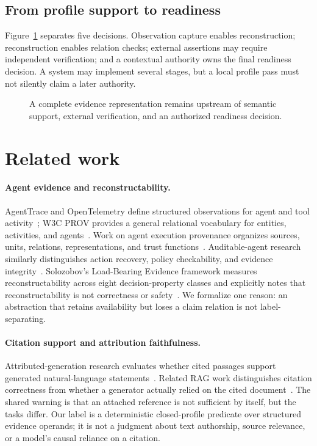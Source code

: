 \documentclass[preprint,12pt]{elsarticle}
\begin{document}
\subsection{From profile support to readiness}

Figure~\ref{fig:layers} separates five decisions. Observation capture enables reconstruction; reconstruction enables relation checks; external assertions may require independent verification; and a contextual authority owns the final readiness decision. A system may implement several stages, but a local profile pass must not silently claim a later authority.

\begin{figure}[t]
  \centering
  \resizebox{\textwidth}{!}{}
  \caption{A complete evidence representation remains upstream of semantic support, external verification, and an authorized readiness decision.}
  \label{fig:layers}
\end{figure}

\section{Related work}

\paragraph{Agent evidence and reconstructability.}
AgentTrace and OpenTelemetry define structured observations for agent and tool activity~\cite{alsayyad2026agenttrace,otel2026genai}; W3C PROV provides a general relational vocabulary for entities, activities, and agents~\cite{groth2013prov}. Work on agent execution provenance organizes sources, units, relations, representations, and trust functions~\cite{wang2026provenance}. Auditable-agent research similarly distinguishes action recovery, policy checkability, and evidence integrity~\cite{nian2026auditable}. Solozobov's Load-Bearing Evidence framework measures reconstructability across eight decision-property classes and explicitly notes that reconstructability is not correctness or safety~\cite{solozobov2026load}. We formalize one reason: an abstraction that retains availability but loses a claim relation is not label-separating.

\paragraph{Citation support and attribution faithfulness.}
Attributed-generation research evaluates whether cited passages support generated natural-language statements~\cite{gao2023alce}. Related RAG work distinguishes citation correctness from whether a generator actually relied on the cited document~\cite{wallat2024correctness}. The shared warning is that an attached reference is not sufficient by itself, but the tasks differ. Our label is a deterministic closed-profile predicate over structured evidence operands; it is not a judgment about text authorship, source relevance, or a model's causal reliance on a citation.
\end{document}
